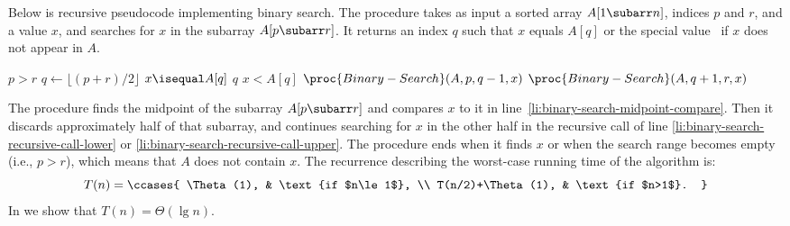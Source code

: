
\noindent Below is recursive pseudocode implementing binary search.
The procedure takes as input a sorted array $A[1\subarr n]$, indices $p$ and $r$, and a value $x$, and searches for $x$ in the subarray $A[p\subarr r]$.
It returns an index $q$ such that $x$ equals $A[q]$ or the special value \nil\ if $x$ does not appear in $A$.

\begin{codebox}
\li \If $p>r$
\li     \Then \Return \nil \label{li:binary-search-not-found}
        \End
\li $q\gets\lfloor(p+r)/2\rfloor$
\li \If $x\isequal A[q]$ \label{li:binary-search-midpoint-compare}
\li     \Then \Return $q$
        \End
\li \If $x<A[q]$
\li     \Then \Return $\proc{Binary-Search}(A,p,q-1,x)$ \label{li:binary-search-recursive-call-lower}
\li     \Else \Return $\proc{Binary-Search}(A,q+1,r,x)$ \label{li:binary-search-recursive-call-upper}
        \End
\end{codebox}

The procedure finds the midpoint of the subarray $A[p\subarr r]$ and compares $x$ to it in line~\ref{li:binary-search-midpoint-compare}.
Then it discards approximately half of that subarray, and continues searching for $x$ in the other half in the recursive call of line \ref{li:binary-search-recursive-call-lower} or \ref{li:binary-search-recursive-call-upper}.
The procedure ends when it finds $x$ or when the search range becomes empty (i.e., $p>r$), which means that $A$ does not contain $x$.
The recurrence describing the worst-case running time of the algorithm is:
\[
    T(n) =
    \ccases{
        \Theta(1), & \text{if $n\le1$}, \\
        T(n/2)+\Theta(1), & \text{if $n>1$}.
    }
\]
In  we show that $T(n)=\Theta(\lg n)$.
